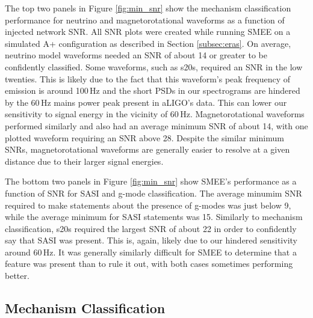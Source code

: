 \documentclass[letterpaper, aps, prd, twocolumn, superscriptaddress, showpacs, nofootinbib]{revtex4}
\begin{document}
The top two panels in Figure \ref{fig:min_snr} show the mechanism classification performance for neutrino and magnetorotational waveforms as a function of injected network SNR. All SNR plots were created while running SMEE on a simulated A+ configuration as described in Section \ref{subsec:eras}. On average, neutrino model waveforms needed an SNR of about 14 or greater to be confidently classified. Some waveforms, such as s20s, required an SNR in the low twenties. This is likely due to the fact that this waveform's peak frequency of emission is around 100\,Hz and the short PSDs in our spectrograms are hindered by the 60\,Hz mains power peak present in aLIGO's data. This can lower our sensitivity to signal energy in the vicinity of 60\,Hz. Magnetorotational waveforms performed similarly and also had an average minimum SNR of about 14, with one plotted waveform requiring an SNR above 28. Despite the similar minimum SNRs, magnetorotational waveforms are generally easier to resolve at a given distance due to their larger signal energies. 

The bottom two panels in Figure \ref{fig:min_snr} show SMEE's performance as a function of SNR for SASI and g-mode classification. The average minumim SNR required to make statements about the presence of g-modes was just below 9, while the average minimum for SASI statements was 15. Similarly to mechanism classification, s20s required the largest SNR of about 22 in order to confidently say that SASI was present. This is, again, likely due to our hindered sensitivity around 60\,Hz. It was generally similarly difficult for SMEE to determine that a feature was present than to rule it out, with both cases sometimes performing better.

\subsection{Mechanism Classification}
\label{subsec:mechanism_range}
\end{document}
